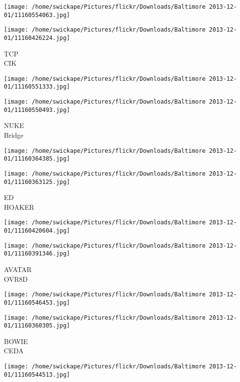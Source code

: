 \documentclass[10pt,letterpaper]{article}
\begin{document}
\texttt{[image: /home/swickape/Pictures/flickr/Downloads/Baltimore 2013-12-01/11160554063.jpg]}

\vspace{0.25in}
\texttt{[image: /home/swickape/Pictures/flickr/Downloads/Baltimore 2013-12-01/11160426224.jpg]}

TCP\\
CIK\\
\pagebreak

\texttt{[image: /home/swickape/Pictures/flickr/Downloads/Baltimore 2013-12-01/11160551333.jpg]}

\vspace{0.25in}
\texttt{[image: /home/swickape/Pictures/flickr/Downloads/Baltimore 2013-12-01/11160550493.jpg]}

NUKE\\
Bridge\\
\pagebreak

\texttt{[image: /home/swickape/Pictures/flickr/Downloads/Baltimore 2013-12-01/11160364385.jpg]}

\vspace{0.25in}
\texttt{[image: /home/swickape/Pictures/flickr/Downloads/Baltimore 2013-12-01/11160363125.jpg]}

ED\\
HOAKER\\
\pagebreak

\texttt{[image: /home/swickape/Pictures/flickr/Downloads/Baltimore 2013-12-01/11160420604.jpg]}

\vspace{0.25in}
\texttt{[image: /home/swickape/Pictures/flickr/Downloads/Baltimore 2013-12-01/11160391346.jpg]}

AVATAR\\
OVR8D\\
\pagebreak

\texttt{[image: /home/swickape/Pictures/flickr/Downloads/Baltimore 2013-12-01/11160546453.jpg]}

\vspace{0.25in}
\texttt{[image: /home/swickape/Pictures/flickr/Downloads/Baltimore 2013-12-01/11160360305.jpg]}

BOWIE\\
CEDA\\
\pagebreak

\texttt{[image: /home/swickape/Pictures/flickr/Downloads/Baltimore 2013-12-01/11160544513.jpg]}
\end{document}
